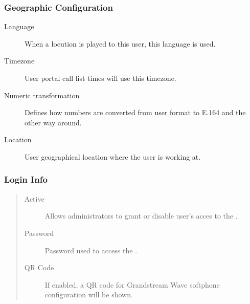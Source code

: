\documentclass[letterpaper,10pt,english]{sphinxmanual}
\begin{document}
\subsubsection{Geographic Configuration}
\label{administration_portal/client/vpbx/users:geographic-configuration}\begin{description}
\item[{Language}] \leavevmode{}\label{administration_portal/client/vpbx/users:term-language}
When a locution is played to this user, this language is used.

\item[{Timezone}] \leavevmode{}\label{administration_portal/client/vpbx/users:term-timezone}
User portal call list times will use this timezone.

\item[{Numeric transformation}] \leavevmode{}\label{administration_portal/client/vpbx/users:term-numeric-transformation}
Defines how numbers are converted from user format to E.164 and
the other way around.

\item[{Location}] \leavevmode{}\label{administration_portal/client/vpbx/users:term-location}
User geographical location where the user is working at.

\end{description}


\subsubsection{Login Info}
\label{administration_portal/client/vpbx/users:login-info}\begin{quote}
\begin{description}
\item[{Active}] \leavevmode
Allows administrators to grant or disable user's acces to the
{\hyperref[user_portal/index:userportal]{}}.

\item[{Password}] \leavevmode
Password used to access the {\hyperref[user_portal/index:userportal]{}}.

\item[{QR Code}] \leavevmode
If enabled, a QR code for Grandstream Wave softphone configuration
will be shown.

\end{description}
\end{quote}
\end{document}
